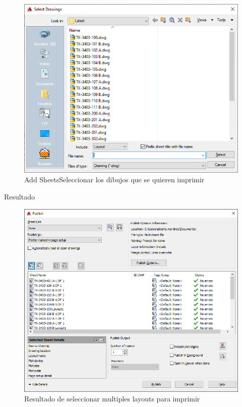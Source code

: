 \documentclass[12pt,letterpaper,final]{report}
\begin{document}
\begin{figure}[H]
	\centering
	\includegraphics[width=0.85\linewidth, height=0.5\textheight,keepaspectratio]{Imagenes/autocad_publish_03}
	\caption{Add Sheets\textrightarrow Seleccionar los dibujos que se quieren imprimir}
	\label{fig:autocadpublish03}
\end{figure}


\begin{center}
\end{center}

\pagebreak

{\LARGE Resultado}

\begin{figure}[H]
	\centering
	\includegraphics[width=0.85\linewidth, height=0.5\textheight,keepaspectratio]{Imagenes/autocad_publish_04}
	\caption{Resultado de seleccionar multiples layouts para imprimir}
	\label{fig:autocadpublish04}
\end{figure}
\end{document}
